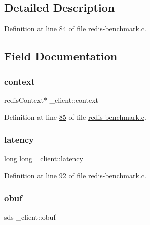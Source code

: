 \subsection{Detailed Description}


Definition at line \hyperlink{redis-benchmark_8c_source_l00084}{84} of file \hyperlink{redis-benchmark_8c_source}{redis-\/benchmark.\+c}.



\subsection{Field Documentation}
\mbox{\label{struct__client_a2180e6fe84ab03b7ba66cc1a042c8dce}} 
\subsubsection{\texorpdfstring{context}{context}}
{\footnotesize\ttfamily redis\+Context$\ast$ \+\_\+client\+::context}



Definition at line \hyperlink{redis-benchmark_8c_source_l00085}{85} of file \hyperlink{redis-benchmark_8c_source}{redis-\/benchmark.\+c}.

\mbox{\label{struct__client_ad9cf812e88222e91e13a67879941d0aa}} 
\subsubsection{\texorpdfstring{latency}{latency}}
{\footnotesize\ttfamily long long \+\_\+client\+::latency}



Definition at line \hyperlink{redis-benchmark_8c_source_l00092}{92} of file \hyperlink{redis-benchmark_8c_source}{redis-\/benchmark.\+c}.

\mbox{\label{struct__client_adeff017bf03ed263e419459cd77f54bf}} 
\subsubsection{\texorpdfstring{obuf}{obuf}}
{\footnotesize\ttfamily sds \+\_\+client\+::obuf}



